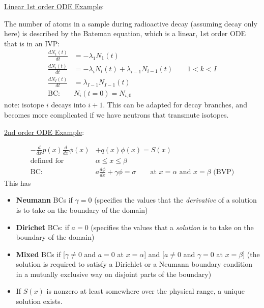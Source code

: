 \documentclass[12pt]{article}
\begin{document}
\vspace*{1em}
\noindent \underline{Linear 1st order ODE Example}:

The number of atoms in a sample during radioactive decay (assuming decay only here) is described by the Bateman equation, which is a linear, 1st order ODE that is in an IVP:
%
\begin{align}
\frac{dN_1(t)}{dt} &= -\lambda_1 N_1(t) \nonumber \\
\frac{dN_i(t)}{dt} &= -\lambda_i N_i(t) + \lambda_{i-1}N_{i-1}(t) \qquad 1 < k < I \nonumber\\
\frac{dN_I(t)}{dt} &= \lambda_{I-1} N_{I-1}(t) \nonumber \\
\text{BC: }& N_i(t=0) = N_{i,0}\nonumber
\end{align}
%
note: isotope $i$ decays into $i+1$. This can be adapted for decay branches, and becomes more complicated if we have neutrons that transmute isotopes. 

\vspace*{1em}
\underline{2nd order ODE Example}:

\begin{align}
-\frac{d}{dx}p(x) \frac{d}{dx}\phi(x) &+ q(x)\phi(x) = S(x) \nonumber \\
\text{defined for }& \alpha \le x \le \beta \nonumber \\
\text{BC: }& a\frac{d\phi}{dx} + \gamma \phi = \sigma \qquad \text{at } x=\alpha \text{ and } x = \beta \text{ (BVP)}\nonumber
\end{align}
%
This has
\begin{itemize}
\item \textbf{Neumann} BCs if $\gamma = 0$ (specifies the values that the \textit{derivative} of a solution is to take on the boundary of the domain)
\item \textbf{Dirichet} BCs: if $a=0$ (specifies the values that a \textit{solution} is to take on the boundary of the domain)
\item \textbf{Mixed} BCs if [$\gamma \ne 0$ and $a = 0$ at $x = \alpha$] and [$a \ne 0$ and $\gamma = 0$ at $x = \beta$] (the solution is required to satisfy a Dirichlet or a Neumann boundary condition in a mutually exclusive way on disjoint parts of the boundary)
\item If $S(x)$ is nonzero at least somewhere over the physical range, a unique solution exists.
\end{itemize}
\end{document}
